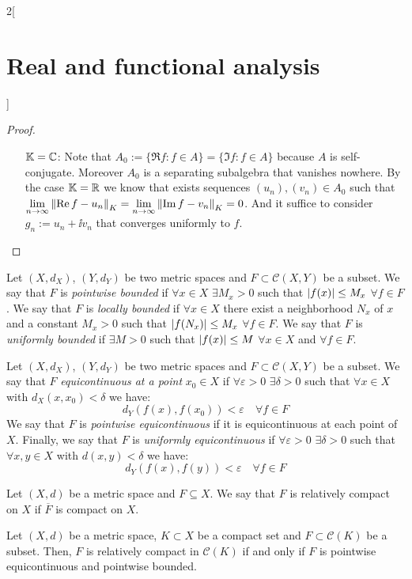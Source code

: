 \documentclass[../../../main_math.tex]{subfiles}
\begin{document}
\begin{multicols}{2}[\section{Real and functional analysis}]
\begin{proof}
\begin{itemize}[leftmargin=1.3cm]
      \item[$\mathbb{K}=\mathbb{C}$:] Note that $A_0:=\{\Re f:f\in A\}=\{\Im f:f\in A\}$ because $A$ is self-conjugate. Moreover $A_0$ is a separating subalgebra that vanishes nowhere. By the case $\mathbb{K}=\mathbb{R}$ we know that exists sequences $(u_n),(v_n)\in A_0$ such that $\displaystyle\lim_{n\to\infty}\left\|\Re f-u_n\right\|_K=\lim_{n\to\infty}\left\|\Im f-v_n\right\|_K=0$. And it suffice to consider $g_n:=u_n+\ii v_n$ that converges uniformly to $f$.
    \end{itemize}
  \end{proof}
  \begin{definition}
    Let $(X,d_X)$, $(Y,d_Y)$ be two metric spaces and $F\subset\mathcal{C}(X,Y)$ be a subset.
    We say that $F$ is \emph{pointwise bounded} if $\forall x\in X$ $\exists M_x>0$ such that $\abs{f(x)}\leq M_x$ $\forall f\in F$.
    We say that $F$ is \emph{locally bounded} if $\forall x\in X$ there exist a neighborhood $N_x$ of $x$ and a constant $M_x>0$ such that $\abs{f(N_x)}\leq M_x$ $\forall f\in F$.
    We say that $F$ is \emph{uniformly bounded} if $\exists M>0$ such that $\abs{f(x)}\leq M$ $\forall x\in X$ and $\forall f\in F$.
  \end{definition}
  \begin{definition}
    Let $(X,d_X)$, $(Y,d_Y)$ be two metric spaces and $F\subset\mathcal{C}(X,Y)$ be a subset. We say that $F$ \emph{equicontinuous at a point} $x_0\in X$ if $\forall \varepsilon>0$ $\exists \delta>0$ such that $\forall x\in X$ with $d_X(x,x_0)<\delta$ we have: $$d_Y(f(x),f(x_0))<\varepsilon\quad\forall f\in F$$
    We say that $F$ is \emph{pointwise equicontinuous} if it is equicontinuous at each point of $X$. Finally, we say that $F$ is \emph{uniformly equicontinuous} if $\forall \varepsilon>0$ $\exists \delta>0$ such that $\forall x,y\in X$ with $d(x,y)<\delta$ we have: $$d_Y(f(x),f(y))<\varepsilon\quad\forall f\in F$$
  \end{definition}
  \begin{definition}
    Let $(X,d)$ be a metric space and $F\subseteq X$. We say that $F$ is relatively compact on $X$ if $\overline{F}$ is compact on $X$.
  \end{definition}
  \begin{important}
    \begin{theorem}\label{RFA:arzela}
      Let $(X,d)$ be a metric space, $K\subset X$ be a compact set and $F\subset \mathcal{C}(K)$ be a subset. Then, $F$ is relatively compact in $\mathcal{C}(K)$ if and only if $F$ is pointwise equicontinuous and pointwise bounded.
    \end{theorem}
  \end{important}


\end{multicols}
\end{document}

